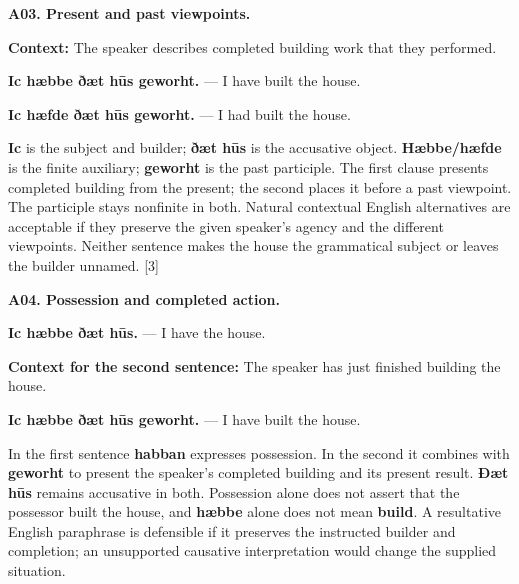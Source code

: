 \par\begin{minipage}{\linewidth}\raggedright
\textbf{A03. Present and past viewpoints.}

\textbf{Context:} The speaker describes completed building work that they performed.

\textbf{Ic hæbbe ðæt hūs geworht.} — I have built the house.

\textbf{Ic hæfde ðæt hūs geworht.} — I had built the house.

\textbf{Ic} is the subject and builder; \textbf{ðæt hūs} is the accusative object. \textbf{Hæbbe/\allowbreak{}hæfde} is the finite auxiliary; \textbf{geworht} is the past participle. The first clause presents completed building from the present; the second places it before a past viewpoint. The participle stays nonfinite in both. Natural contextual English alternatives are acceptable if they preserve the given speaker's agency and the different viewpoints. Neither sentence makes the house the grammatical subject or leaves the builder unnamed. [3]

\end{minipage}\par\addvspace{4pt}

\par\begin{minipage}{\linewidth}\raggedright
\textbf{A04. Possession and completed action.}

\textbf{Ic hæbbe ðæt hūs.} — I have the house.

\textbf{Context for the second sentence:} The speaker has just finished building the house.

\textbf{Ic hæbbe ðæt hūs geworht.} — I have built the house.

In the first sentence \textbf{habban} expresses possession. In the second it combines with \textbf{geworht} to present the speaker's completed building and its present result. \textbf{Ðæt hūs} remains accusative in both. Possession alone does not assert that the possessor built the house, and \textbf{hæbbe} alone does not mean \textbf{build}. A resultative English paraphrase is defensible if it preserves the instructed builder and completion; an unsupported causative interpretation would change the supplied situation.

\end{minipage}\par\addvspace{4pt}

